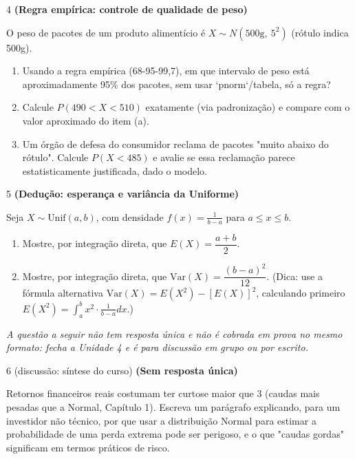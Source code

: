 \documentclass[11pt]{article}
\begin{document}
\begin{questao}{4} \textbf{(Regra empírica: controle de qualidade de peso)}

O peso de pacotes de um produto alimentício é $X\sim N(500\text{g},\ 5^2)$ (rótulo indica 500g).

\begin{enumerate}[label=(\alph*)]
  \item Usando a regra empírica (68-95-99,7), em que intervalo de peso está aproximadamente 95\%
    dos pacotes, sem usar `pnorm`/tabela, só a regra?
  \item Calcule $P(490 < X < 510)$ exatamente (via padronização) e compare com o valor
    aproximado do item (a).
  \item Um órgão de defesa do consumidor reclama de pacotes "muito abaixo do rótulo". Calcule
    $P(X<485)$ e avalie se essa reclamação parece estatisticamente justificada, dado o modelo.
\end{enumerate}
\end{questao}

\begin{questao}{5} \textbf{(Dedução: esperança e variância da Uniforme)}

Seja $X\sim\text{Unif}(a,b)$, com densidade $f(x)=\frac{1}{b-a}$ para $a\le x\le b$.

\begin{enumerate}[label=(\alph*)]
  \item Mostre, por integração direta, que $E(X) = \dfrac{a+b}{2}$.
  \item Mostre, por integração direta, que $\mathrm{Var}(X) = \dfrac{(b-a)^2}{12}$. (Dica: use a
    fórmula alternativa $\mathrm{Var}(X)=E(X^2)-[E(X)]^2$, calculando primeiro
    $E(X^2)=\int_a^b x^2\cdot\frac{1}{b-a}dx$.)
\end{enumerate}
\end{questao}

\bigskip
\noindent\textit{A questão a seguir não tem resposta única e não é cobrada em prova no mesmo
formato: fecha a Unidade 4 e é para discussão em grupo ou por escrito.}

\begin{questao}{6 (discussão: síntese do curso)} \textbf{(Sem resposta única)}

Retornos financeiros reais costumam ter curtose maior que 3 (caudas mais pesadas que a Normal,
Capítulo 1). Escreva um parágrafo explicando, para um investidor não técnico, por que usar a
distribuição Normal para estimar a probabilidade de uma perda extrema pode ser perigoso, e o que
"caudas gordas" significam em termos práticos de risco.
\end{questao}
\end{document}
